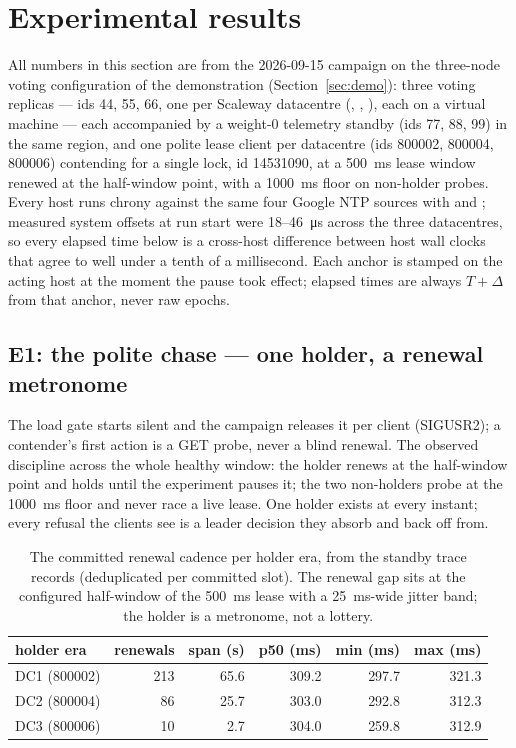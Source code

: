 \section{Experimental results}\label{sec:experiments}

All numbers in this section are from the 2026-09-15 campaign on the
three-node voting configuration of the  demonstration
(Section~\ref{sec:demo}): three voting replicas --- ids 44, 55, 66, one
per Scaleway datacentre (, ,
), each on a  virtual machine --- each
accompanied by a weight-0 telemetry standby (ids 77, 88, 99) in the
same region, and one polite lease client per datacentre (ids 800002,
800004, 800006) contending for a single lock, id 14531090, at a 500~ms
lease window renewed at the half-window point, with a 1000~ms floor on
non-holder probes. Every host runs chrony against the same four Google
NTP sources with  and ; measured
system offsets at run start were 18--46~\si{\micro\s} across the three
datacentres, so every elapsed time below is a cross-host difference
between host wall clocks that agree to well under a tenth of a
millisecond. Each anchor is  stamped on the acting
host at the moment the pause took effect; elapsed times are always
$T+\Delta$ from that anchor, never raw epochs.

\subsection{E1: the polite chase --- one holder, a renewal metronome}

The load gate starts silent and the campaign releases it per client
(SIGUSR2); a contender's first action is a GET probe, never a blind
renewal. The observed discipline across the whole healthy window: the
holder renews at the half-window point and holds until the experiment
pauses it; the two non-holders probe at the 1000~ms floor and never
race a live lease. One holder exists at every instant; every refusal
the clients see is a leader decision they absorb and back off from.

\begin{table}[t]
\centering
\small
\begin{tabular}{lrrrrr}
\toprule
holder era & renewals & span (s) & p50 (ms) & min (ms) & max (ms) \\
\midrule
DC1 (800002) & 213 & 65.6 & 309.2 & 297.7 & 321.3 \\
DC2 (800004) & 86 & 25.7 & 303.0 & 292.8 & 312.3 \\
DC3 (800006) & 10 & 2.7 & 304.0 & 259.8 & 312.9 \\
\bottomrule
\end{tabular}
\caption{The committed renewal cadence per holder era, from the
standby trace records (deduplicated per committed slot). The renewal
gap sits at the configured half-window of the 500~ms lease with a
25~ms-wide jitter band; the holder is a metronome, not a lottery.}
\label{tab:renewal}
\end{table}

